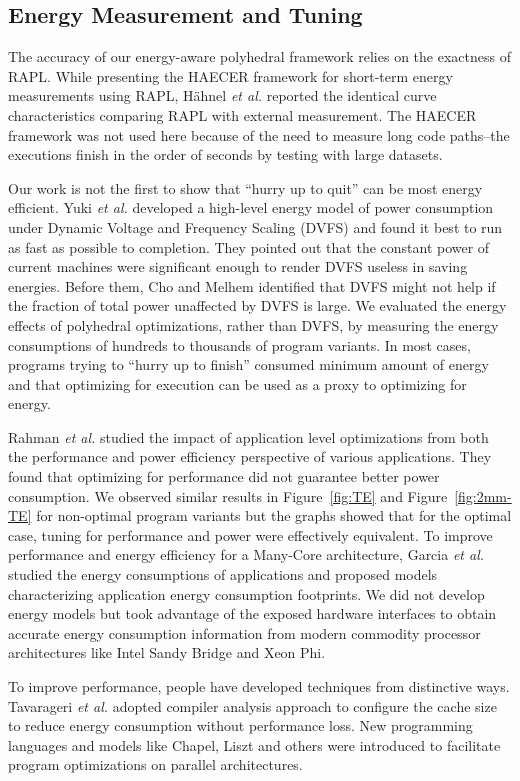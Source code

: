 \subsection{Energy Measurement and Tuning}
The accuracy of our energy-aware polyhedral framework relies on the exactness
of RAPL. While presenting the HAECER framework for short-term energy measurements 
using RAPL, H\"{a}hnel {\it et al.} reported the identical
curve characteristics comparing RAPL with external measurement\cite{RAPL-Related}.
The HAECER framework was not used here because of the need to measure long code
paths--the executions finish in the order of seconds by testing with large datasets.

Our work is not the first to show that ``hurry up to quit'' can be most energy
efficient. Yuki {\it et al.} developed a high-level energy model of power consumption
under Dynamic Voltage and Frequency Scaling (DVFS) and found it best to run
as fast as possible to completion\cite{SpeedEnergy}. They pointed out that the 
constant power of current machines were significant enough to render DVFS useless in saving energies.
Before them, Cho and Melhem\cite{Cho} identified that DVFS might not help if the fraction
of total power unaffected by DVFS is large.
We evaluated the energy effects of polyhedral optimizations, rather than DVFS,
by measuring the energy consumptions of hundreds to thousands of program variants.
In most cases, programs trying to ``hurry up to finish'' consumed minimum
amount of energy and that optimizing for execution can be used as a proxy to optimizing for energy.

Rahman {\it et al.}\cite{CF12} studied the impact of application level optimizations from both the 
performance and power efficiency perspective of various applications. They found
that optimizing for performance did not guarantee better power consumption. We 
observed similar results in Figure~\ref{fig:TE} and Figure~\ref{fig:2mm-TE} for non-optimal
program variants but the graphs showed that for the optimal case, tuning for performance and power were 
effectively equivalent. To improve performance and energy efficiency for a Many-Core architecture,
Garcia {\it et al.}\cite{Garcia} studied the energy consumptions of applications and proposed models 
characterizing application energy consumption footprints. We did not
develop energy models but took advantage of the exposed hardware interfaces to obtain accurate   
energy consumption information from modern commodity processor architectures like
Intel Sandy Bridge and Xeon Phi.

To improve performance, people have 
developed techniques from distinctive ways. Tavarageri {\it et al.}\cite{Reduce-Cache} 
adopted compiler analysis approach to configure the cache size to reduce energy consumption
without performance loss. New programming languages\cite{IPDPS13:LULESH} and 
models like Chapel, Liszt and others were introduced to facilitate program optimizations
on parallel architectures.
